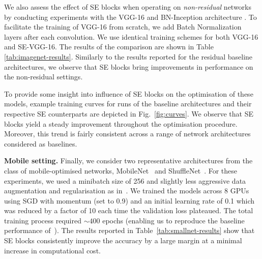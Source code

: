 We also assess the effect of SE blocks when operating on \textit{non-residual} networks by conducting experiments with the VGG-16 \cite{simonyan_iclr2015vgg} and BN-Inception architecture \cite{ioffe_icml2015bn}.  To facilitate the training of VGG-16 from scratch, we add Batch Normalization layers after each convolution. We use identical training schemes for both VGG-16 and SE-VGG-16. The results of the comparison are shown in Table \ref{tab:imagenet-results}. Similarly to the results reported for the residual baseline architectures, we observe that SE blocks bring improvements in performance on the non-residual settings.

To provide some insight into influence of SE blocks on the optimisation of these models, example training curves for runs of the baseline architectures 
and their respective SE counterparts are depicted in Fig.~\ref{fig:curves}.
We observe that SE blocks yield a steady improvement throughout the optimisation procedure.  Moreover, this trend is fairly consistent across a range of network architectures considered as baselines.

\vspace{5pt}
\noindent\textbf{Mobile setting.} Finally, we consider two representative architectures from the class of mobile-optimised networks, MobileNet~\cite{howard_2017mobilenets} and ShuffleNet~\cite{zhang_cvpr2018shufflenet}. For these experiments, we used a minibatch size of 256 and slightly less aggressive data augmentation and regularisation as in~\cite{zhang_cvpr2018shufflenet}. We trained the models across 8 GPUs using SGD with momentum (set to 0.9) and an initial learning rate of 0.1 which was reduced by a factor of 10 each time the validation loss plateaued. The total training process required \mbox{$\sim400$} epochs (enabling us to reproduce the baseline performance of~\cite{zhang_cvpr2018shufflenet}). The results reported in Table~\ref{tab:smallnet-results} show that SE blocks consistently improve the accuracy by a large margin at a minimal increase in computational cost.



